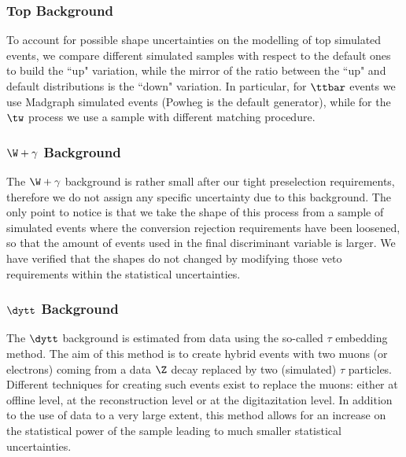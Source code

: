 \subsubsection{Top Background}
To account for possible shape uncertainties on the modelling of top simulated
events, we compare different simulated samples with respect to the default ones 
to build the ``up" variation, while the mirror of the ratio between the ``up" 
and default distributions is the ``down" variation. In particular, for $\ttbar$
events we use Madgraph simulated events (Powheg is the default generator), while
for the $\tw$ process we use a sample with different matching procedure.

\subsubsection{$\W+\gamma$ Background}
The $\W+\gamma$ background is rather small after our tight preselection
requirements, therefore we do not assign any specific uncertainty due to this
background. The only point to notice is that we take the shape of this process
from a sample of simulated events where the conversion rejection requirements
have been loosened, so that the amount of events used in the final discriminant
variable is larger. We have verified that the shapes do not changed by modifying
those veto requirements within the statistical uncertainties.

\subsubsection{$\dytt$ Background}
The $\dytt$ background is estimated from data using the so-called $\tau$
embedding method. The aim of this method is to create hybrid events with two 
muons (or electrons) coming from a data $\Z$ decay replaced by two 
(simulated) $\tau$ particles. Different techniques for creating such events
exist to replace the muons: either at offline level, at the reconstruction 
level or at the digitazitation level. In addition to the use of data to a very
large extent, this method allows for an increase on the statistical power of the
sample leading to much smaller statistical uncertainties.

